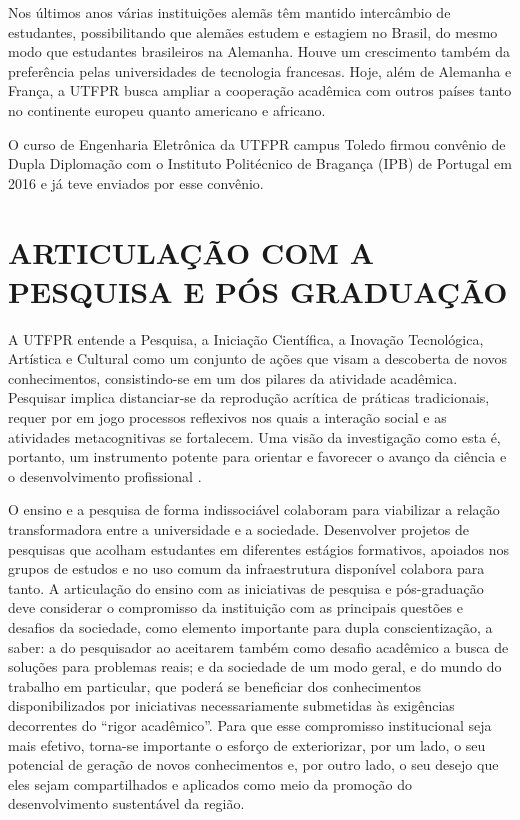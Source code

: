 Nos últimos anos várias instituições alemãs têm mantido intercâmbio de estudantes, possibilitando que alemães estudem e estagiem no Brasil, do mesmo modo que estudantes brasileiros na Alemanha. Houve um crescimento também da preferência pelas universidades de tecnologia francesas. Hoje, além de Alemanha e França, a UTFPR busca ampliar a cooperação acadêmica com outros países tanto no continente europeu quanto americano e africano.

O curso de Engenharia Eletrônica da UTFPR campus Toledo firmou convênio de Dupla Diplomação com o Instituto Politécnico de Bragança (IPB) de Portugal em 2016 e já teve  enviados por esse convênio. 


\section{ARTICULAÇÃO COM A PESQUISA E PÓS GRADUAÇÃO}

A UTFPR entende a Pesquisa, a Iniciação Científica, a Inovação Tecnológica, Artística e Cultural como um conjunto de ações que visam a descoberta de novos conhecimentos, consistindo-se em um dos pilares da atividade acadêmica. Pesquisar implica distanciar-se da reprodução acrítica de práticas tradicionais, requer por em jogo processos reflexivos nos quais a interação social e as atividades metacognitivas se fortalecem. Uma visão da investigação como esta é, portanto, um instrumento potente para orientar e favorecer o avanço da ciência e o desenvolvimento profissional \cite{pizzatoconcepccoes}.

O ensino e a pesquisa de forma indissociável colaboram para viabilizar a relação transformadora entre a universidade e a sociedade. Desenvolver projetos de pesquisas que acolham estudantes em diferentes estágios formativos, apoiados nos grupos de estudos e no uso comum da infraestrutura disponível colabora para tanto. A articulação do ensino com as iniciativas de pesquisa e pós-graduação deve considerar o compromisso da instituição com as principais questões e desafios da sociedade, como elemento importante para dupla conscientização, a saber: a do pesquisador ao aceitarem também como desafio acadêmico a busca de soluções para problemas reais; e da sociedade de um modo geral, e do mundo do trabalho em particular, que poderá se beneficiar dos conhecimentos disponibilizados por iniciativas necessariamente submetidas às exigências decorrentes do ``rigor acadêmico''. Para que esse compromisso institucional seja mais efetivo, torna-se importante o esforço de exteriorizar, por um lado, o seu potencial de geração de novos conhecimentos e, por outro lado, o seu desejo que eles sejam compartilhados e aplicados como meio da promoção do desenvolvimento sustentável da região.

